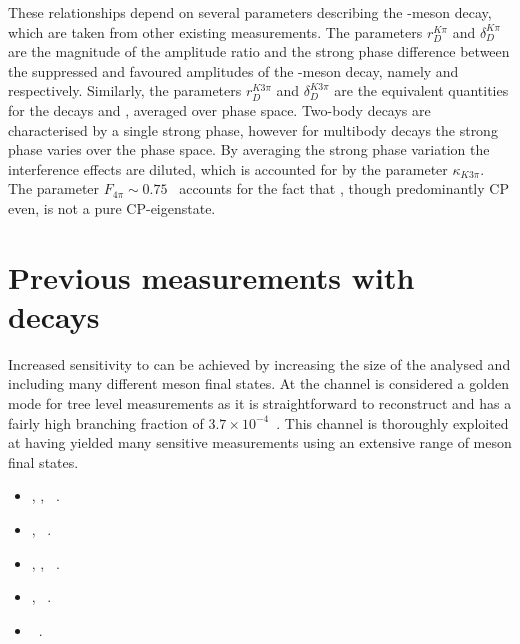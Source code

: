 These relationships depend on several parameters describing the \D-meson decay, which are taken from other existing measurements. The parameters $r_D^{K\pi}$ and $\delta_D^{K\pi}$ are the magnitude of the amplitude ratio and the strong phase difference between the suppressed and favoured amplitudes of the \D-meson decay, namely \decay{\Dz}{\Kp\pim} and \decay{\Dz}{\Km\pip} respectively. Similarly, the parameters $r_D^{K3\pi}$ and $\delta_D^{K3\pi}$ are the equivalent quantities for the decays \decay{\Dz}{\Kp\pim\pip\pim} and \decay{\Dz}{\Km\pip\pim\pip}, averaged over phase space. Two-body \decay{\D}{\Kmp\pipm} decays are characterised by a single strong phase, however for multibody \decay{\D}{\Kmp\pipm\pimp\pipm} decays the strong phase varies over the phase space. By averaging the strong phase variation the interference effects are diluted, which is accounted for by the parameter $\kappa_{K3\pi}$. The parameter $F_{4\pi} \sim 0.75$~\cite{charm4pi} accounts for the fact that \decay{\D}{\pip\pim\pip\pim}, though predominantly CP even, is not a pure CP-eigenstate.


\section{Previous \Pgamma measurements with  decays}

Increased sensitivity to \Pgamma can be achieved by increasing the size of the \dataset analysed and including many different \D meson final states. At \lhcb the \decay{\Bm}{\D\Km} channel is considered a golden mode for tree level \Pgamma measurements as it is straightforward to reconstruct and has a fairly high branching fraction of $3.7 \times 10^{-4}$~\cite{PDG2016}. This \decay{\Bm}{\D\Km} channel is thoroughly exploited at \lhcb having yielded many \Pgamma sensitive measurements using an extensive range of \D meson final states.
\begin{itemize}
\item \decay{\D}{\Kp\pim}, \Kp\Km, \pip\pim~\cite{LHCb-PAPER-2017-021}.
\item \decay{\D}{\Kp\pim\pip\pim}, \pip\pim\pip\pim~\cite{LHCb-PAPER-2016-003}.
\item \decay{\D}{\Kp\pim\piz}, \Kp\Km\piz, \pip\pim\piz~\cite{LHCb-PAPER-2015-014}.
\item \decay{\D}{\KS\Kp\Km}, \KS\pip\pim~\cite{LHCb-PAPER-2014-041}.
\item \decay{\D}{\KS\Kp\Km}~\cite{LHCb-PAPER-2013-068}.
\end{itemize}

